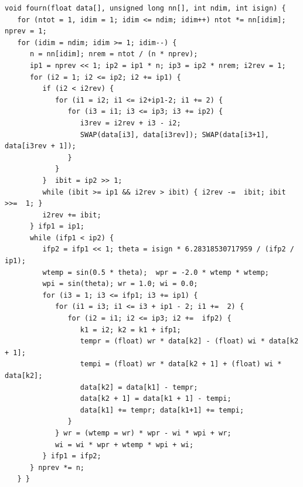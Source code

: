       \begin{frame}[fragile]{}
         \begin{verbatim}
void fourn(float data[], unsigned long nn[], int ndim, int isign) {
   for (ntot = 1, idim = 1; idim <= ndim; idim++) ntot *= nn[idim]; nprev = 1;
   for (idim = ndim; idim >= 1; idim--) {
      n = nn[idim]; nrem = ntot / (n * nprev);
      ip1 = nprev << 1; ip2 = ip1 * n; ip3 = ip2 * nrem; i2rev = 1;
      for (i2 = 1; i2 <= ip2; i2 += ip1) {
         if (i2 < i2rev) {
            for (i1 = i2; i1 <= i2+ip1-2; i1 += 2) {
               for (i3 = i1; i3 <= ip3; i3 += ip2) {
                  i3rev = i2rev + i3 - i2;
                  SWAP(data[i3], data[i3rev]); SWAP(data[i3+1], data[i3rev + 1]);
               }
            }
         }  ibit = ip2 >> 1;
         while (ibit >= ip1 && i2rev > ibit) { i2rev -=  ibit; ibit >>=  1; }
         i2rev += ibit;
      } ifp1 = ip1;
      while (ifp1 < ip2) {
         ifp2 = ifp1 << 1; theta = isign * 6.28318530717959 / (ifp2 / ip1);
         wtemp = sin(0.5 * theta);  wpr = -2.0 * wtemp * wtemp;
         wpi = sin(theta); wr = 1.0; wi = 0.0;
         for (i3 = 1; i3 <= ifp1; i3 += ip1) {
            for (i1 = i3; i1 <= i3 + ip1 - 2; i1 +=  2) {
               for (i2 = i1; i2 <= ip3; i2 +=  ifp2) {
                  k1 = i2; k2 = k1 + ifp1;
                  tempr = (float) wr * data[k2] - (float) wi * data[k2 + 1];
                  tempi = (float) wr * data[k2 + 1] + (float) wi * data[k2];
                  data[k2] = data[k1] - tempr;
                  data[k2 + 1] = data[k1 + 1] - tempi;
                  data[k1] += tempr; data[k1+1] += tempi;
               }
            } wr = (wtemp = wr) * wpr - wi * wpi + wr;
            wi = wi * wpr + wtemp * wpi + wi;
         } ifp1 = ifp2;
      } nprev *= n; 
   } }
         \end{verbatim}
\end{frame}

